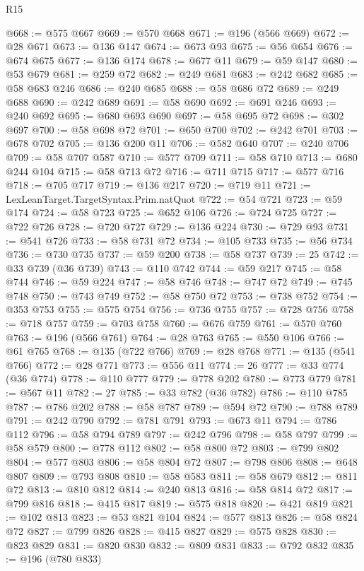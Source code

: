 \begin{lexlean}{R15}
\begin{coremodule}
@668 := @575 @667
@669 := @570 @668
@671 := @196 (@566 @669)
@672 := @28 @671
@673 := @136 @147
@674 := @673 @93
@675 := @56 @654
@676 := @674 @675
@677 := @136 @174
@678 := @677 @11
@679 := @59 @147
@680 := @53 @679
@681 := @259 @72
@682 := @249 @681
@683 := @242 @682
@685 := @58 @683 @246
@686 := @240 @685
@688 := @58 @686 @72
@689 := @249 @688
@690 := @242 @689
@691 := @58 @690
@692 := @691 @246
@693 := @240 @692
@695 := @680 @693 @690
@697 := @58 @695 @72
@698 := @302 @697
@700 := @58 @698 @72
@701 := @650 @700
@702 := @242 @701
@703 := @678 @702
@705 := @136 @200 @11
@706 := @582 @640
@707 := @240 @706
@709 := @58 @707 @587
@710 := @577 @709
@711 := @58 @710
@713 := @680 @244 @104
@715 := @58 @713 @72
@716 := @711 @715
@717 := @577 @716
@718 := @705 @717
@719 := @136 @217
@720 := @719 @11
@721 := LexLeanTarget.TargetSyntax.Prim.natQuot
@722 := @54 @721
@723 := @59 @174
@724 := @58 @723
@725 := @652 @106
@726 := @724 @725
@727 := @722 @726
@728 := @720 @727
@729 := @136 @224
@730 := @729 @93
@731 := @541 @726
@733 := @58 @731 @72
@734 := @105 @733
@735 := @56 @734
@736 := @730 @735
@737 := @59 @200
@738 := @58 @737
@739 := 25
@742 := @33 @739 (@36 @739)
@743 := @110 @742
@744 := @59 @217
@745 := @58 @744
@746 := @59 @224
@747 := @58 @746
@748 := @747 @72
@749 := @745 @748
@750 := @743 @749
@752 := @58 @750 @72
@753 := @738 @752
@754 := @353 @753
@755 := @575 @754
@756 := @736 @755
@757 := @728 @756
@758 := @718 @757
@759 := @703 @758
@760 := @676 @759
@761 := @570 @760
@763 := @196 (@566 @761)
@764 := @28 @763
@765 := @550 @106
@766 := @61 @765
@768 := @135 (@722 @766)
@769 := @28 @768
@771 := @135 (@541 @766)
@772 := @28 @771
@773 := @556 @11
@774 := 26
@777 := @33 @774 (@36 @774)
@778 := @110 @777
@779 := @778 @202
@780 := @773 @779
@781 := @567 @11
@782 := 27
@785 := @33 @782 (@36 @782)
@786 := @110 @785
@787 := @786 @202
@788 := @58 @787
@789 := @594 @72
@790 := @788 @789
@791 := @242 @790
@792 := @781 @791
@793 := @673 @11
@794 := @786 @112
@796 := @58 @794 @789
@797 := @242 @796
@798 := @58 @797
@799 := @58 @579
@800 := @778 @112
@802 := @58 @800 @72
@803 := @799 @802
@804 := @577 @803
@806 := @58 @804 @72
@807 := @798 @806
@808 := @648 @807
@809 := @793 @808
@810 := @58 @583
@811 := @58 @679
@812 := @811 @72
@813 := @810 @812
@814 := @240 @813
@816 := @58 @814 @72
@817 := @799 @816
@818 := @415 @817
@819 := @575 @818
@820 := @421 @819
@821 := @102 @813
@823 := @53 @821 @104
@824 := @577 @813
@826 := @58 @824 @72
@827 := @799 @826
@828 := @415 @827
@829 := @575 @828
@830 := @823 @829
@831 := @820 @830
@832 := @809 @831
@833 := @792 @832
@835 := @196 (@780 @833)

\end{coremodule}
\end{lexlean}
